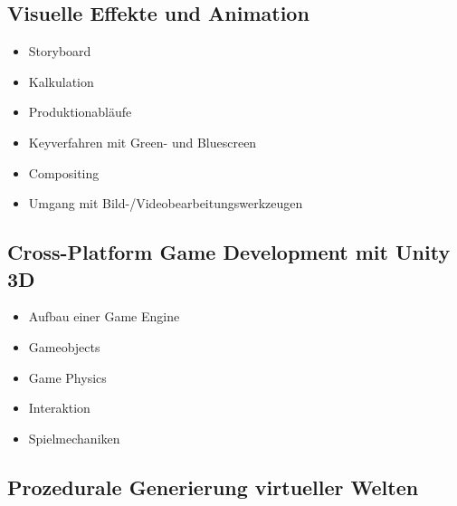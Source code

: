 \subsection*{Visuelle Effekte und
Animation\label{/mi-2017/modulbeschreibungen-bachelor/BA_Vertiefung-Visual-Computing}}\label{visuelle-effekte-und-animationpathlabelmi-2017modulbeschreibungen-bachelorbaux5fvertiefung-visual-computing-2}

\begin{itemize}
\tightlist
\item
  Storyboard
\item
  Kalkulation
\item
  Produktionabläufe
\item
  Keyverfahren mit Green- und Bluescreen
\item
  Compositing
\item
  Umgang mit Bild-/Videobearbeitungswerkzeugen
\end{itemize}

\subsection*{Cross-Platform Game Development mit Unity
3D\label{/mi-2017/modulbeschreibungen-bachelor/BA_Vertiefung-Visual-Computing}}\label{cross-platform-game-development-mit-unity-3dpathlabelmi-2017modulbeschreibungen-bachelorbaux5fvertiefung-visual-computing-1}

\begin{itemize}
\tightlist
\item
  Aufbau einer Game Engine
\item
  Gameobjects
\item
  Game Physics
\item
  Interaktion
\item
  Spielmechaniken
\end{itemize}

\subsection*{Prozedurale Generierung virtueller
Welten\label{/mi-2017/modulbeschreibungen-bachelor/BA_Vertiefung-Visual-Computing}}\label{prozedurale-generierung-virtueller-weltenpathlabelmi-2017modulbeschreibungen-bachelorbaux5fvertiefung-visual-computing-2}

